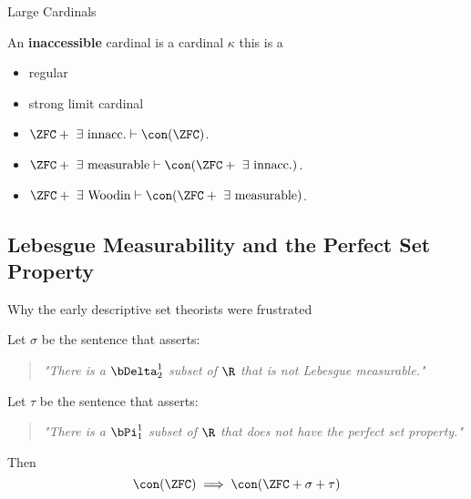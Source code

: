 \documentclass{beamer}
\begin{document}
\begin{frame}{Large Cardinals}

\begin{definition}
An \textbf{inaccessible} cardinal is a cardinal $\kappa$ this is a
\begin{itemize}
\item regular
\item strong limit cardinal
\end{itemize}
\end{definition}

\begin{itemize}
\item $\ZFC + \text{ } \exists \text{ innacc.} \vdash \con(\ZFC)$.
\item $\ZFC + \text{ } \exists \text{ measurable} \vdash \con(\ZFC + \text{ } \exists \text{ innacc.})$.
\item $\ZFC + \text{ } \exists \text{ Woodin} \vdash \con(\ZFC + \text{ } \exists \text{ measurable})$.
\end{itemize}
\end{frame}

\subsection{Lebesgue Measurability and the Perfect Set Property}

\begin{frame}{Why the early descriptive set theorists were frustrated}
\begin{theorem}[G\"{o}del, 1938]

Let $\sigma$ be the sentence that asserts:
\begin{quotation}
\emph{"There is a $\bDelta^1_2$ subset
of $\R$ that is not Lebesgue measurable."}
\end{quotation}

Let $\tau$ be the sentence that asserts:
\begin{quotation}
\emph{"There is a $\bPi^1_1$ subset of $\R$ that does not
have the perfect set property."}
\end{quotation}

Then
$$\con(\ZFC) \implies \con(\ZFC + \sigma + \tau)$$
\end{theorem}
\end{frame}
\end{document}
